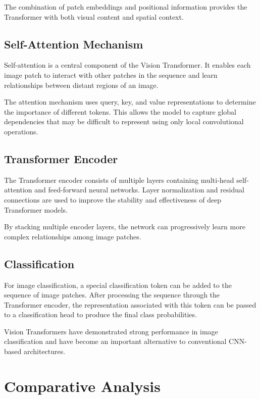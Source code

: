 \documentclass[conference]{IEEEtran}
\begin{document}
The combination of patch embeddings and positional information provides the Transformer with both visual content and spatial context.

\subsection{Self-Attention Mechanism}

Self-attention is a central component of the Vision Transformer. It enables each image patch to interact with other patches in the sequence and learn relationships between distant regions of an image.

The attention mechanism uses query, key, and value representations to determine the importance of different tokens. This allows the model to capture global dependencies that may be difficult to represent using only local convolutional operations.

\subsection{Transformer Encoder}

The Transformer encoder consists of multiple layers containing multi-head self-attention and feed-forward neural networks. Layer normalization and residual connections are used to improve the stability and effectiveness of deep Transformer models.

By stacking multiple encoder layers, the network can progressively learn more complex relationships among image patches.

\subsection{Classification}

For image classification, a special classification token can be added to the sequence of image patches. After processing the sequence through the Transformer encoder, the representation associated with this token can be passed to a classification head to produce the final class probabilities.

Vision Transformers have demonstrated strong performance in image classification and have become an important alternative to conventional CNN-based architectures.

\section{Comparative Analysis}
\end{document}
